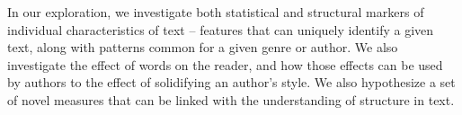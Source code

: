 In our exploration, we investigate both statistical and structural markers of individual characteristics of text -- features that can uniquely identify a given text, along with patterns common for a given genre or author. We also investigate the effect of words on the reader, and how those effects can be used by authors to the effect of solidifying an author's style. We also hypothesize a set of novel measures that can be linked with the understanding of structure in text.  